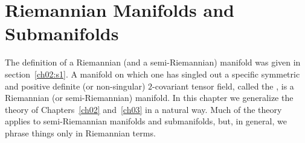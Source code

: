 \documentclass[../main]{subfiles}
\begin{document}
\chapter{Riemannian Manifolds and Submanifolds}\label{ch06}

The definition of a Riemannian (and a semi-Riemannian) manifold was given in section~\ref{ch02:s1}. A manifold on which one has singled out a specific symmetric and positive definite (or non-singular) $2$-covariant tensor field, called the , is a Riemannian (or semi-Riemannian) manifold. In this chapter we generalize the theory of Chapters~\ref{ch02} and~\ref{ch03} in a natural way. Much of the theory applies to semi-Riemannian manifolds and submanifolds, but, in general, we phrase things only in Riemannian terms.










\end{document}
